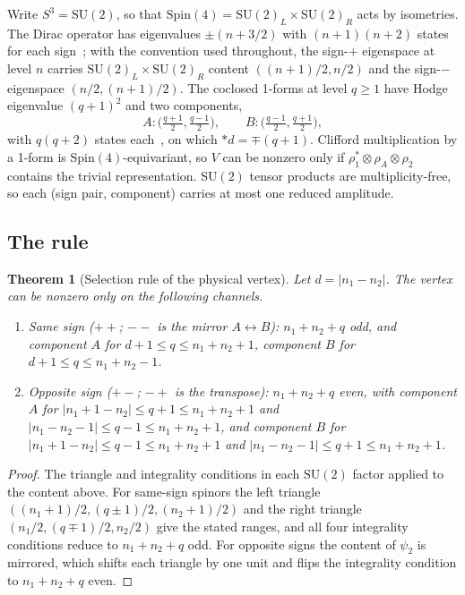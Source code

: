 \documentclass[11pt]{article}
\newtheorem{theorem}{Theorem}
\begin{document}
Write $S^3 = \mathrm{SU}(2)$, so that
$\mathrm{Spin}(4) = \mathrm{SU}(2)_L \times \mathrm{SU}(2)_R$ acts by
isometries.  The Dirac operator has eigenvalues $\pm(n + 3/2)$ with
$(n+1)(n+2)$ states for each sign~\cite{camporesi1996}; with the
convention used throughout, the sign-$+$ eigenspace at level $n$ carries
$\mathrm{SU}(2)_L \times \mathrm{SU}(2)_R$ content $((n+1)/2, n/2)$ and
the sign-$-$ eigenspace $(n/2, (n+1)/2)$.  The coclosed 1-forms at level
$q \ge 1$ have Hodge eigenvalue $(q+1)^2$ and two components,
\begin{equation}
  A: \bigl(\tfrac{q+1}{2}, \tfrac{q-1}{2}\bigr), \qquad
  B: \bigl(\tfrac{q-1}{2}, \tfrac{q+1}{2}\bigr),
  \label{eq:vector_content}
\end{equation}
with $q(q+2)$ states each~\cite{ikeda1978}, on which $*d = \mp(q+1)$.
Clifford multiplication by a 1-form is $\mathrm{Spin}(4)$-equivariant,
so $V$ can be nonzero only if
$\rho_1^* \otimes \rho_A \otimes \rho_2$ contains the trivial
representation.  $\mathrm{SU}(2)$ tensor products are multiplicity-free,
so each (sign pair, component) carries at most one reduced amplitude.

\subsection{The rule}

\begin{theorem}[Selection rule of the physical vertex]
\label{thm:physical_rule}
Let $d = |n_1 - n_2|$.  The vertex can be nonzero only on the following
channels.
\begin{enumerate}
\item \emph{Same sign} ($++$; $--$ is the mirror $A \leftrightarrow B$):
  $n_1 + n_2 + q$ odd, and component $A$ for
  $d + 1 \le q \le n_1 + n_2 + 1$, component $B$ for
  $d + 1 \le q \le n_1 + n_2 - 1$.
\item \emph{Opposite sign} ($+-$; $-+$ is the transpose): $n_1 + n_2 + q$
  even, with component $A$ for
  $|n_1 + 1 - n_2| \le q + 1 \le n_1 + n_2 + 1$ and
  $|n_1 - n_2 - 1| \le q - 1 \le n_1 + n_2 + 1$, and component $B$ for
  $|n_1 + 1 - n_2| \le q - 1 \le n_1 + n_2 + 1$ and
  $|n_1 - n_2 - 1| \le q + 1 \le n_1 + n_2 + 1$.
\end{enumerate}
\end{theorem}

\begin{proof}
The triangle and integrality conditions in each $\mathrm{SU}(2)$ factor
applied to the content above.  For same-sign spinors the left triangle
$((n_1+1)/2, (q\pm1)/2, (n_2+1)/2)$ and the right triangle
$(n_1/2, (q\mp1)/2, n_2/2)$ give the stated ranges, and all four
integrality conditions reduce to $n_1 + n_2 + q$ odd.  For opposite
signs the content of $\psi_2$ is mirrored, which shifts each triangle by
one unit and flips the integrality condition to $n_1 + n_2 + q$ even.
\end{proof}
\end{document}

